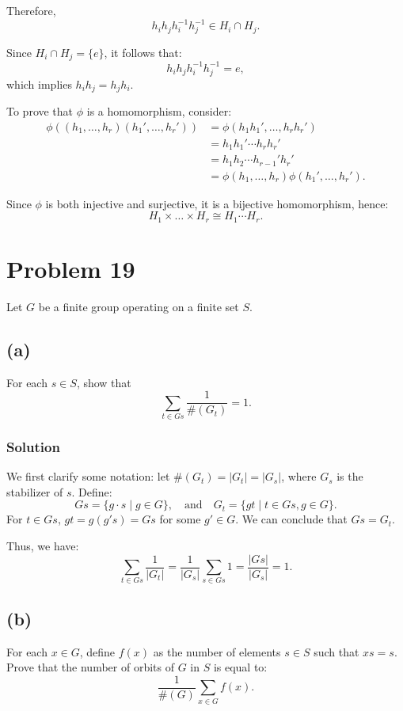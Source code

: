 \documentclass[12pt]{article}
\begin{document}
Therefore, 
\[
h_i h_j h_i^{-1} h_j^{-1} \in H_i \cap H_j.
\]

Since \( H_i \cap H_j = \{e\} \), it follows that:
\[
h_i h_j h_i^{-1} h_j^{-1} = e,
\]
which implies \( h_i h_j = h_j h_i \).

To prove that \( \phi \) is a homomorphism, consider:
\begin{align*}
    \phi((h_1, \ldots, h_r)(h_1', \ldots, h_r')) &= \phi(h_1 h_1', \ldots, h_r h_r') \\
    &= h_1 h_1' \cdots h_r h_r' \\
    &= h_1 h_2 \cdots h_{r-1}' h_r' \\
    &= \phi(h_1, \ldots, h_r) \phi(h_1', \ldots, h_r').
\end{align*}

Since \( \phi \) is both injective and surjective, it is a bijective homomorphism, hence:
\[
H_1 \times \ldots \times H_r \cong H_1 \cdots H_r.
\]

\section*{Problem 19}
Let \( G \) be a finite group operating on a finite set \( S \).

\subsection*{(a)}
For each \( s \in S \), show that 
\[
\sum_{t \in Gs} \frac{1}{\#(G_t)} = 1.
\]

\subsubsection*{Solution}
We first clarify some notation: let \( \#(G_t) = |G_t| = |G_s| \), where \( G_s \) is the stabilizer of \( s \). Define:
\[
Gs = \{g \cdot s \mid g \in G\}, \quad \text{and} \quad G_t = \{g t \mid t \in Gs, g \in G\}.
\]
For \( t \in Gs \), \( g t = g(g' s) = Gs \) for some \( g' \in G \). We can conclude that \( Gs = G_t \). 

Thus, we have:
\[
\sum_{t \in Gs} \frac{1}{|G_t|} = \frac{1}{|G_s|} \sum_{s \in Gs} 1 = \frac{|Gs|}{|G_s|} = 1.
\]

\subsection*{(b)}
For each \( x \in G \), define \( f(x) \) as the number of elements \( s \in S \) such that \( x s = s \). Prove that the number of orbits of \( G \) in \( S \) is equal to:
\[
\frac{1}{\#(G)} \sum_{x \in G} f(x).
\]
\end{document}
